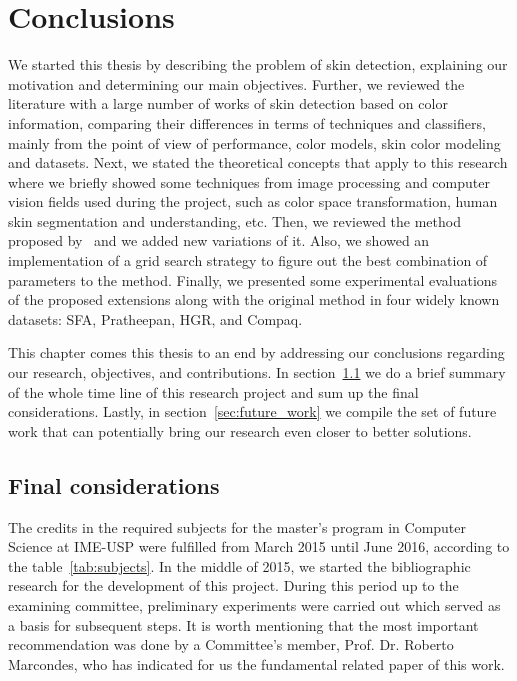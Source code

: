 \chapter{Conclusions}
\label{cap:conclusoes}

We started this thesis by describing the problem of skin detection, explaining our motivation and determining our main objectives. Further, we reviewed the literature with a large number of works of skin detection based on color information, comparing their differences in terms of techniques and classifiers, mainly from the point of view of performance, color models, skin color modeling and datasets. Next, we stated the theoretical concepts that apply to this research where we briefly showed some techniques from image processing and computer vision fields used during the project, such as color space transformation, human skin segmentation and understanding, etc. Then, we reviewed the method proposed by~\citet{brancati:17} and we added new variations of it. Also, we showed an implementation of a grid search strategy to figure out the best combination of parameters to the method. Finally, we presented some experimental evaluations of the proposed extensions along with the original method in four widely known datasets: SFA, Pratheepan, HGR, and Compaq.

This chapter comes this thesis to an end by addressing our conclusions regarding our research, objectives, and contributions. In section~\ref{sec:final_considerations} we do a brief summary of the whole time line of this research project and sum up the final considerations. Lastly, in section~\ref{sec:future_work} we compile the set of future work that can potentially bring our research even closer to better solutions.


\section{Final considerations}
\label{sec:final_considerations}
The credits in the required subjects for the master's program in Computer Science at IME-USP were fulfilled from March 2015 until June 2016, according to the table~\ref{tab:subjects}. In the middle of 2015, we started the bibliographic research for the development of this project. During this period up to the examining committee, preliminary experiments were carried out which served as a basis for subsequent steps. It is worth mentioning that the most important recommendation was done by a Committee's member, Prof. Dr. Roberto Marcondes, who has indicated for us the fundamental related paper of this work.


